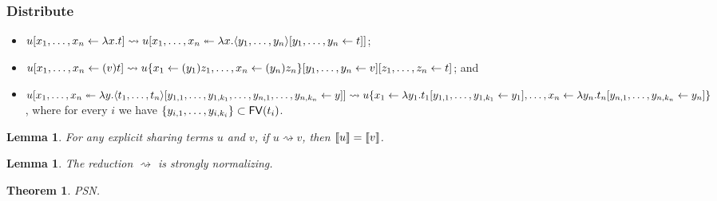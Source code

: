 \documentclass[11pt,a4paper]{article}
\theoremstyle{definition}
\theoremstyle{plain}
\newtheorem{lemma}[definition]{Lemma}
\newtheorem{theorem}[definition]{Theorem}
\theoremstyle{remark}
\begin{document}
\subsubsection{Distribute}

\begin{itemize}
 \item ${{{u}[{{x_1},\dots,{x_n}}\leftarrow{\lambda x.t}]}} \rightsquigarrow {{u}[{x_1},\dots,{x_n}\twoheadleftarrow{\lambda{x}.{{{{{\langle{y_1},\dots,{y_n}{\rangle}}}[{{y_1},\dots,{y_n}}\leftarrow{t}]}}}}]}$;
 \item ${{{u}[{{x_1},\dots,{x_n}}\leftarrow{(v)t}]}} \rightsquigarrow {{{{{{{{u}\{{x_1}\leftarrow{(y_1)z_1},\dots,{x_n}\leftarrow{(y_n)z_n}\}}}[{{y_1},\dots,{y_n}}\leftarrow{v}]}}}[{{z_1},\dots,{z_n}}\leftarrow{t}]}}$; and
 \item ${{u}[{x_1},\dots,{x_n}\twoheadleftarrow{\lambda{y}.{{{{\langle{t_1},\dots,{t_n}{\rangle}}}[{y_{1,1},\dots,y_{1,k_1},\dots,y_{n,1},\dots,y_{n,k_n}}\leftarrow{y}]}}}]}\rightsquigarrow {{u}\{{x_1}\leftarrow{\lambda y_1.{{{t_1}[{{y_{1,1}},\dots,{y_{1,k_1}}}\leftarrow{y_1}]}}},\dots,{x_n}\leftarrow{\lambda y_n.{{{t_n}[{{y_{n,1}},\dots,{y_{n,k_n}}}\leftarrow{y_n}]}}}\}}$, where for every $i$ we have $\{y_{i,1},\dots,y_{i,k_i}\}\subset{\mathop{\mathsf{FV}}}(t_i)$.
\end{itemize}

\begin{lemma}
For any explicit sharing terms $u$ and $v$, if $u\rightsquigarrow v$, then ${\llbracket{u}\rrbracket}={\llbracket{v}\rrbracket}$.
\end{lemma}

\begin{lemma}
The reduction $\rightsquigarrow$ is strongly normalizing.
\end{lemma}

\begin{theorem}
PSN.
\end{theorem}
\end{document}
